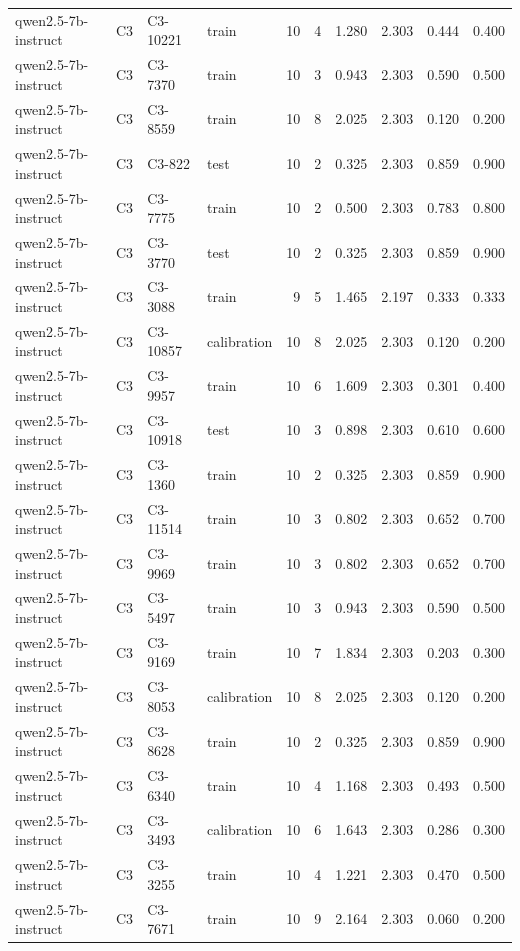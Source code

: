 \begin{table}
\begin{tabular}{llllrrrrrr}
qwen2.5-7b-instruct & C3 & C3-10221 & train & 10 & 4 & 1.280 & 2.303 & 0.444 & 0.400 \\
qwen2.5-7b-instruct & C3 & C3-7370 & train & 10 & 3 & 0.943 & 2.303 & 0.590 & 0.500 \\
qwen2.5-7b-instruct & C3 & C3-8559 & train & 10 & 8 & 2.025 & 2.303 & 0.120 & 0.200 \\
qwen2.5-7b-instruct & C3 & C3-822 & test & 10 & 2 & 0.325 & 2.303 & 0.859 & 0.900 \\
qwen2.5-7b-instruct & C3 & C3-7775 & train & 10 & 2 & 0.500 & 2.303 & 0.783 & 0.800 \\
qwen2.5-7b-instruct & C3 & C3-3770 & test & 10 & 2 & 0.325 & 2.303 & 0.859 & 0.900 \\
qwen2.5-7b-instruct & C3 & C3-3088 & train & 9 & 5 & 1.465 & 2.197 & 0.333 & 0.333 \\
qwen2.5-7b-instruct & C3 & C3-10857 & calibration & 10 & 8 & 2.025 & 2.303 & 0.120 & 0.200 \\
qwen2.5-7b-instruct & C3 & C3-9957 & train & 10 & 6 & 1.609 & 2.303 & 0.301 & 0.400 \\
qwen2.5-7b-instruct & C3 & C3-10918 & test & 10 & 3 & 0.898 & 2.303 & 0.610 & 0.600 \\
qwen2.5-7b-instruct & C3 & C3-1360 & train & 10 & 2 & 0.325 & 2.303 & 0.859 & 0.900 \\
qwen2.5-7b-instruct & C3 & C3-11514 & train & 10 & 3 & 0.802 & 2.303 & 0.652 & 0.700 \\
qwen2.5-7b-instruct & C3 & C3-9969 & train & 10 & 3 & 0.802 & 2.303 & 0.652 & 0.700 \\
qwen2.5-7b-instruct & C3 & C3-5497 & train & 10 & 3 & 0.943 & 2.303 & 0.590 & 0.500 \\
qwen2.5-7b-instruct & C3 & C3-9169 & train & 10 & 7 & 1.834 & 2.303 & 0.203 & 0.300 \\
qwen2.5-7b-instruct & C3 & C3-8053 & calibration & 10 & 8 & 2.025 & 2.303 & 0.120 & 0.200 \\
qwen2.5-7b-instruct & C3 & C3-8628 & train & 10 & 2 & 0.325 & 2.303 & 0.859 & 0.900 \\
qwen2.5-7b-instruct & C3 & C3-6340 & train & 10 & 4 & 1.168 & 2.303 & 0.493 & 0.500 \\
qwen2.5-7b-instruct & C3 & C3-3493 & calibration & 10 & 6 & 1.643 & 2.303 & 0.286 & 0.300 \\
qwen2.5-7b-instruct & C3 & C3-3255 & train & 10 & 4 & 1.221 & 2.303 & 0.470 & 0.500 \\
qwen2.5-7b-instruct & C3 & C3-7671 & train & 10 & 9 & 2.164 & 2.303 & 0.060 & 0.200 \\

\end{tabular}
\end{table}
